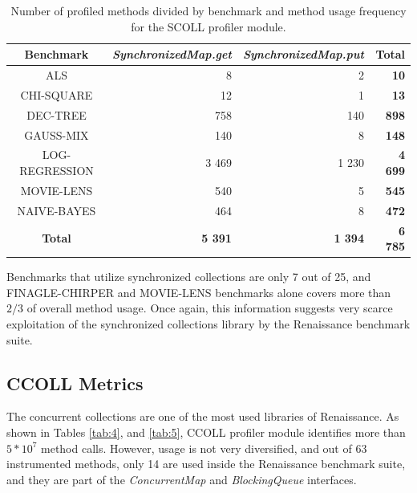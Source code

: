 \documentclass[]{usiinfthesis}
\begin{document}
 
 
\begin{table}[h]
\centering
\caption[Method Usage Frequencies for SCOLL]{Number of profiled methods divided by benchmark and method usage frequency for the SCOLL profiler module.}
\label{tab:3}
\begin{tabular}{|c|r|r|r|}
\hline
\textbf{	Benchmark	}&\textbf{	\textit{SynchronizedMap.get}	}&\textbf{	\textit{SynchronizedMap.put}	}&\textbf{	Total	 }\\ 
\hline
	ALS	&	 8 	&	 2 	&\textbf{	 10 	 }\\ 
CHI-SQUARE	&	 12 	&	 1 	&\textbf{	 13 	 }\\ 
DEC-TREE	&	 758 	&	 140 	&\textbf{	 898 	 }\\ 
GAUSS-MIX	&	 140 	&	 8 	&\textbf{	 148 	 }\\ 
LOG-REGRESSION	&	 3 469 	&	 1 230 	&\textbf{	 4 699 	 }\\ 
MOVIE-LENS	&	 540 	&	 5 	&\textbf{	 545 	 }\\ 
NAIVE-BAYES	&	 464 	&	 8 	&\textbf{	 472 	 }\\ 

	\hline							
	\textbf{Total}	&  \textbf{	 5 391 	}&\textbf{	 1 394 	}&\textbf{	 6 785 	 }\\ 					
\hline			
\end{tabular}
\end{table}%

 
 Benchmarks that utilize synchronized collections are only 7 out of 25, and FINAGLE-CHIRPER and MOVIE-LENS benchmarks alone covers more than \(2/3\) of overall method usage. Once again, this information suggests very scarce exploitation of the synchronized collections library by the Renaissance benchmark suite.
 

\subsection{CCOLL Metrics}
The concurrent collections are one of the most used libraries of Renaissance. As shown in Tables \ref{tab:4}, and \ref{tab:5}, CCOLL profiler module identifies more than \(5*10^7\) method calls. However, usage is not very diversified, and out of 63 instrumented methods, only 14 are used inside the Renaissance benchmark suite, and they are part of the \textit{ConcurrentMap} and \textit{BlockingQueue} interfaces.
\end{document}
